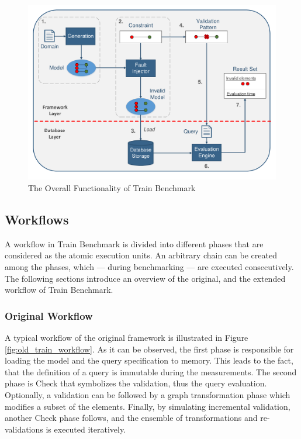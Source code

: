 \begin{figure}[!ht]
	\centering
	\includegraphics[width=150mm, keepaspectratio]{figures/functionality.pdf}
	\caption{The Overall Functionality of Train Benchmark}
	\label{fig:functionality}
\end{figure}

\subsection{Workflows}

A workflow in Train Benchmark is divided into different phases that are considered as the atomic execution units. An arbitrary chain can be created among the phases, which --- during benchmarking --- are executed consecutively. The following sections introduce an overview of the original, and the extended workflow of Train Benchmark.

\subsubsection{Original Workflow}
A typical workflow of the original framework is illustrated in Figure \ref{fig:old_train_workflow}. As it can be observed, the first phase is responsible for loading the model and the query specification to memory. This leads to the fact, that the definition of a query is immutable during the measurements. The second phase is \textsf{Check} that symbolizes the validation, thus the query evaluation. Optionally, a validation can be followed by a graph transformation phase which modifies a subset of the elements. Finally, by simulating incremental validation, another \textsf{Check} phase follows, and the ensemble of transformations and re-validations is executed iteratively.


